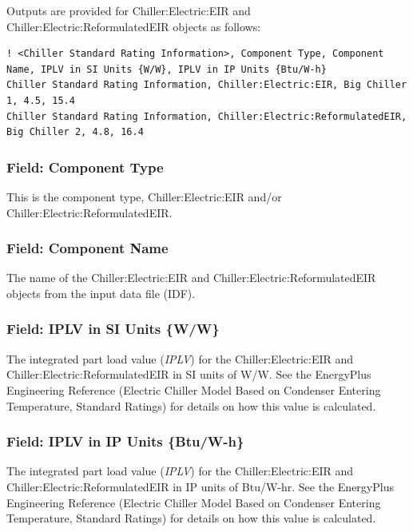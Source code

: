 Outputs are provided for Chiller:Electric:EIR and Chiller:Electric:ReformulatedEIR objects as follows:

\begin{lstlisting}
! <Chiller Standard Rating Information>, Component Type, Component Name, IPLV in SI Units {W/W}, IPLV in IP Units {Btu/W-h}
Chiller Standard Rating Information, Chiller:Electric:EIR, Big Chiller 1, 4.5, 15.4
Chiller Standard Rating Information, Chiller:Electric:ReformulatedEIR, Big Chiller 2, 4.8, 16.4
\end{lstlisting}

\subsubsection{Field: Component Type}\label{field-component-type-6}

This is the component type, Chiller:Electric:EIR and/or Chiller:Electric:ReformulatedEIR.

\subsubsection{Field: Component Name}\label{field-component-name-6}

The name of the Chiller:Electric:EIR and Chiller:Electric:ReformulatedEIR objects from the input data file (IDF).

\subsubsection{Field: IPLV in SI Units \{W/W\}}\label{field-iplv-in-si-units-ww}

The integrated part load value (\emph{IPLV}) for the Chiller:Electric:EIR and Chiller:Electric:ReformulatedEIR in SI units of W/W. See the EnergyPlus Engineering Reference (Electric Chiller Model Based on Condenser Entering Temperature, Standard Ratings) for details on how this value is calculated.

\subsubsection{Field: IPLV in IP Units \{Btu/W-h\}}\label{field-iplv-in-ip-units-btuw-h}

The integrated part load value (\emph{IPLV}) for the Chiller:Electric:EIR and Chiller:Electric:ReformulatedEIR in IP units of Btu/W-hr. See the EnergyPlus Engineering Reference (Electric Chiller Model Based on Condenser Entering Temperature, Standard Ratings) for details on how this value is calculated.

